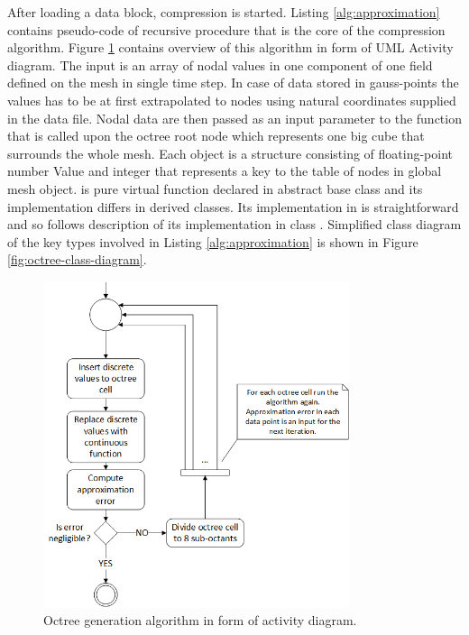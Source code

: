 After loading a data block, compression is started. Listing \ref{alg:approximation} contains pseudo-code of recursive procedure that is the core of the compression algorithm. Figure \ref{fig:octree-generation} contains overview of this algorithm in form of UML Activity diagram. The input is an array of nodal values in one component of one field defined on the mesh in single time step. In case of data stored in gauss-points the values has to be at first extrapolated to nodes using natural coordinates supplied in the data file. Nodal data are then passed as an input parameter  to the function  that is called upon the octree root node which represents one big cube that surrounds the whole mesh. Each  object is a structure consisting of floating-point number Value and integer  that represents a key to the table of nodes in global mesh object.  is pure virtual function declared in abstract base class  and its implementation differs in derived classes. Its implementation in  is straightforward and so follows description of its implementation in class . Simplified class diagram of the key types involved in Listing \ref{alg:approximation} is shown in Figure \ref{fig:octree-class-diagram}.

\begin{figure}[H]
\centering
\includegraphics[width=0.8\textwidth]{figures/chapter-approximation/figure2}
\decoRule
\caption[Octree generation]{Octree generation algorithm in form of activity diagram.}
\label{fig:octree-generation}
\end{figure}


